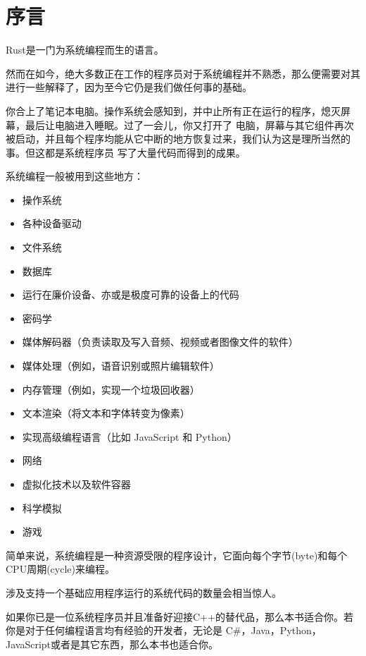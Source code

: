 \chapter{序言}\label{PREFACE}

Rust是一门为系统编程而生的语言。

\medskip
然而在如今，绝大多数正在工作的程序员对于系统编程并不熟悉，那么便需要对其进行一些解释了，因为至今它仍是我们做任何事的基础。

\medskip
你合上了笔记本电脑。操作系统会感知到，并中止所有正在运行的程序，熄灭屏幕，最后让电脑进入睡眠。过了一会儿，你又打开了
电脑，屏幕与其它组件再次被启动，并且每个程序均能从它中断的地方恢复过来，我们认为这是理所当然的事。但这都是系统程序员
写了大量代码而得到的成果。

\medskip
系统编程一般被用到这些地方：
\begin{itemize}
    \item 操作系统
    \item 各种设备驱动
    \item 文件系统
    \item 数据库
    \item 运行在廉价设备、亦或是极度可靠的设备上的代码
    \item 密码学
    \item 媒体解码器（负责读取及写入音频、视频或者图像文件的软件）
    \item 媒体处理（例如，语音识别或照片编辑软件）
    \item 内存管理（例如，实现一个垃圾回收器）
    \item 文本渲染（将文本和字体转变为像素）
    \item 实现高级编程语言（比如 JavaScript 和 Python）
    \item 网络
    \item 虚拟化技术以及软件容器
    \item 科学模拟
    \item 游戏
\end{itemize}
简单来说，系统编程是一种资源受限的程序设计，它面向每个字节(byte)和每个CPU周期(cycle)来编程。

\medskip
涉及支持一个基础应用程序运行的系统代码的数量会相当惊人。


如果你已是一位系统程序员并且准备好迎接C++的替代品，那么本书适合你。若你是对于任何编程语言均有经验的开发者，无论是
C\#，Java，Python，JavaScript或者是其它东西，那么本书也适合你。

